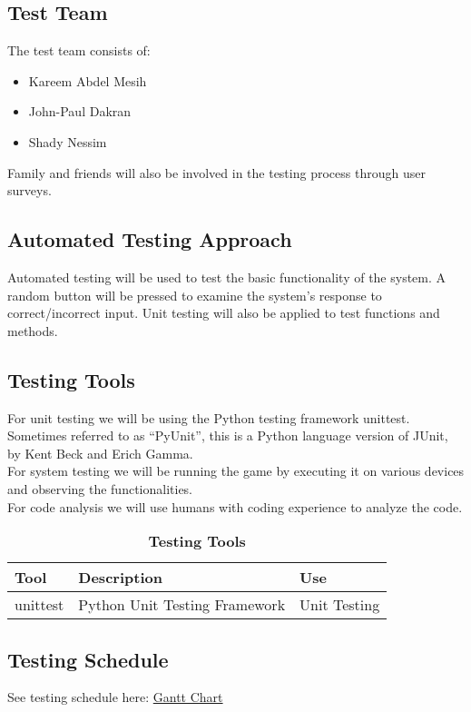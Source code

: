 \documentclass[12pt, titlepage]{article}
\begin{document}
\subsection{Test Team}
The test team consists of:
\begin{itemize}
  \item Kareem Abdel Mesih
  \item John-Paul Dakran
  \item Shady Nessim
\end{itemize}
Family and friends will also be involved in the testing process through user surveys.

\subsection{Automated Testing Approach}
Automated testing will be used to test the basic functionality of the system. A random button will be pressed to examine the system's response to correct/incorrect input. Unit testing will also be applied to test functions and methods.

\subsection{Testing Tools}
For unit testing we will be using the Python testing framework unittest. Sometimes referred to as “PyUnit”, this is a Python language version of JUnit, by Kent Beck and Erich Gamma. \\
For system testing we will be running the game by executing it on various devices and observing the functionalities. \\
For code analysis we will use humans with coding experience to analyze the code.

\begin{table}[h]
\caption{\bf Testing Tools}
\begin{tabularx}{\textwidth}{p{3cm}p{6cm}X}
\toprule {\bf Tool} & {\bf Description} & {\bf Use}\\
\midrule
unittest & Python Unit Testing Framework & Unit Testing \\
\bottomrule
\end{tabularx}
\end{table}

\subsection{Testing Schedule}
\label{subsec:sched}
See testing schedule here:
\href{run:GanttChart.gan} {Gantt Chart}\\
\end{document}
